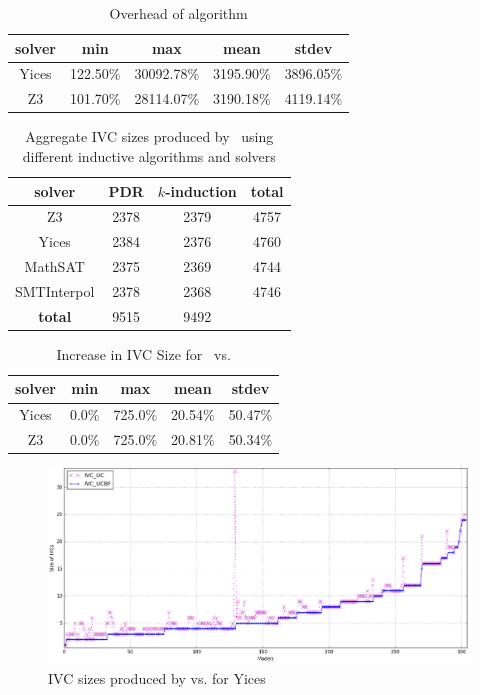 \begin{table}
  \centering
  \begin{tabular}{ |c||c|c|c|c| }
    \hline
     solver & min & max & mean & stdev \\[0.5ex]
    \hline
    Yices & 122.50\%  & 30092.78\%   & 3195.90\% & 3896.05\% \\[0.5ex]
    \hline
    Z3 & 101.70\%  & 28114.07\%   & 3190.18\% & 4119.14\% \\[0.5ex]
    \hline
  \end{tabular}
  \caption{Overhead of \ucbfalg algorithm}
  \label{tab:overhead-ucbfalg}
\end{table}

\begin{table}
  \centering
  \begin{tabular}{ |c|c|c|c| }
    \hline
     solver & PDR & $k$-induction & \textbf{total} \\
    \hline
      Z3 & 2378 & 2379 & 4757 \\
      Yices & 2384 & 2376 & 4760 \\
      MathSAT & 2375 & 2369 & 4744 \\
      SMTInterpol & 2378 & 2368 & 4746 \\
    \hline
      \textbf{total} & 9515 & 9492 &   \\
    \hline
  \end{tabular}
  \caption{Aggregate IVC sizes produced by \ucalg\ using different inductive algorithms and solvers}
  \label{tab:minimality-algorithm-solvers}
\end{table}

\begin{table}
  \centering
  \begin{tabular}{ |c||c|c|c|c| }
    \hline
     solver & min & max & mean & stdev \\[0.5ex]
    \hline
    Yices &   0.0\%   & 725.0\% & 20.54\% & 50.47\% \\[0.5ex]
    Z3 &   0.0\%   & 725.0\% & 20.81\% & 50.34\% \\[0.5ex]
    \hline
  \end{tabular}
  \caption{Increase in IVC Size for \ucalg\ vs. \ucbfalg}
  \label{tab:overhead-ucbfalg}
\end{table}


\begin{figure}
  \centering
  \includegraphics[width=\textwidth]{figs/minimality.png}
  \caption{IVC sizes produced by \ucalg vs. \ucbfalg for Yices}
  \label{fig:minimality-all}
\end{figure}

